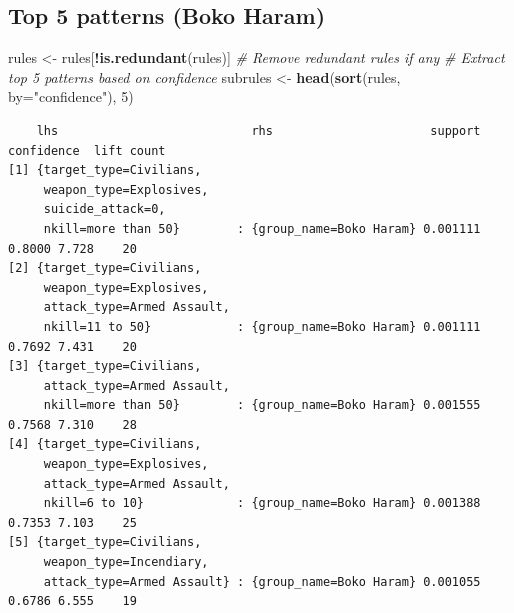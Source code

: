 \documentclass[11pt,oneside,a4paper]{reedthesis}
\newenvironment{Shaded}{\begin{snugshade}}{\end{snugshade}}
\newcommand{\KeywordTok}[1]{\textcolor[rgb]{0.13,0.29,0.53}{\textbf{#1}}}
\newcommand{\DataTypeTok}[1]{\textcolor[rgb]{0.13,0.29,0.53}{#1}}
\newcommand{\DecValTok}[1]{\textcolor[rgb]{0.00,0.00,0.81}{#1}}
\newcommand{\StringTok}[1]{\textcolor[rgb]{0.31,0.60,0.02}{#1}}
\newcommand{\CommentTok}[1]{\textcolor[rgb]{0.56,0.35,0.01}{\textit{#1}}}
\newcommand{\OperatorTok}[1]{\textcolor[rgb]{0.81,0.36,0.00}{\textbf{#1}}}
\newcommand{\NormalTok}[1]{#1}
\begin{document}
\subsection{Top 5 patterns (Boko
Haram)}\label{top-5-patterns-boko-haram}
\begin{Shaded}
\begin{Highlighting}[]
\NormalTok{rules <-}\StringTok{ }\NormalTok{rules[}\OperatorTok{!}\KeywordTok{is.redundant}\NormalTok{(rules)] }\CommentTok{# Remove redundant rules if any }
\CommentTok{# Extract top 5 patterns based on confidence}
\NormalTok{subrules <-}\StringTok{ }\KeywordTok{head}\NormalTok{(}\KeywordTok{sort}\NormalTok{(rules, }\DataTypeTok{by=}\StringTok{"confidence"}\NormalTok{), }\DecValTok{5}\NormalTok{)}
\end{Highlighting}
\end{Shaded}
\begin{verbatim}
    lhs                           rhs                      support confidence  lift count
[1] {target_type=Civilians,                                                              
     weapon_type=Explosives,                                                             
     suicide_attack=0,                                                                   
     nkill=more than 50}        : {group_name=Boko Haram} 0.001111     0.8000 7.728    20
[2] {target_type=Civilians,                                                              
     weapon_type=Explosives,                                                             
     attack_type=Armed Assault,                                                          
     nkill=11 to 50}            : {group_name=Boko Haram} 0.001111     0.7692 7.431    20
[3] {target_type=Civilians,                                                              
     attack_type=Armed Assault,                                                          
     nkill=more than 50}        : {group_name=Boko Haram} 0.001555     0.7568 7.310    28
[4] {target_type=Civilians,                                                              
     weapon_type=Explosives,                                                             
     attack_type=Armed Assault,                                                          
     nkill=6 to 10}             : {group_name=Boko Haram} 0.001388     0.7353 7.103    25
[5] {target_type=Civilians,                                                              
     weapon_type=Incendiary,                                                             
     attack_type=Armed Assault} : {group_name=Boko Haram} 0.001055     0.6786 6.555    19
\end{verbatim}
\end{document}
